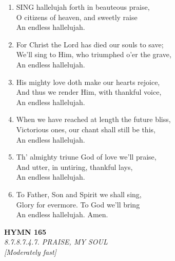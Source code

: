 \documentclass[11pt,a4paper]{article}
\begin{document}
\begin{enumerate}
    \item SING hallelujah forth in beauteous praise, \\
        O citizens of heaven, and sweetly raise \\
        An endless hallelujah.

    \item For Christ the Lord has died our souls to save; \\
        We'll sing to Him, who triumphed o'er the grave, \\
        An endless hallelujah.

    \item His mighty love doth make our hearts rejoice, \\
        And thus we render Him, with thankful voice, \\
        An endless hallelujah.

    \item When we have reached at length the future bliss, \\
        Victorious ones, our chant shall still be this, \\
        An endless hallelujah.

    \item Th' almighty triune God of love we'll praise, \\
        And utter, in untiring, thankful lays, \\
        An endless hallelujah.

    \item To Father, Son and Spirit we shall sing, \\
        Glory for evermore. To God we'll bring \\
        An endless hallelujah. Amen.

\end{enumerate}

\newpage
\begin{center}
    {\Large \textbf{HYMN 165}}
    \\
    \textit{8.7.8.7.4.7. PRAISE, MY SOUL}
    \\
    \textit{\small [Moderately fast]}
\end{center}
\vspace{1em}
\end{document}

